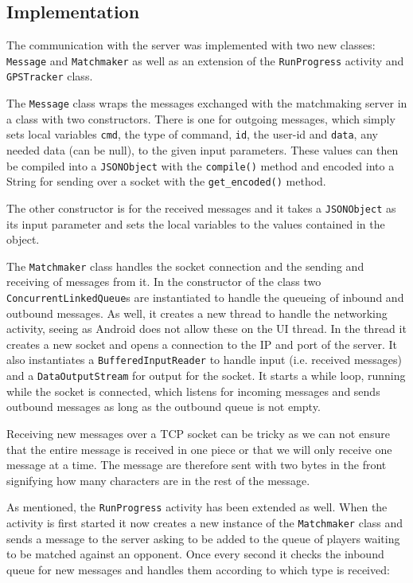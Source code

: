 \subsection{Implementation}
The communication with the server was implemented with two new classes: \texttt{Message} and \texttt{Matchmaker} as well as an extension of the \texttt{RunProgress} activity and \texttt{GPSTracker} class. 
\vspace{10pt}

The \texttt{Message} class wraps the messages exchanged with the matchmaking server in a class with two constructors. There is one for outgoing messages, which simply sets local variables \texttt{cmd}, the type of command, \texttt{id}, the user-id and \texttt{data}, any needed data (can be null), to the given input parameters. These values can then be compiled into a \texttt{JSONObject} with the \texttt{compile()} method and encoded into a String for sending over a socket with the \texttt{get\_encoded()} method. 

The other constructor is for the received messages and it takes a \texttt{JSONObject} as its input parameter and sets the local variables to the values contained in the object.
\vspace{10pt}

The \texttt{Matchmaker} class handles the socket connection and the sending and receiving of messages from it. In the constructor of the class two \texttt{ConcurrentLinkedQueue}s are instantiated to handle the queueing of inbound and outbound messages. As well, it creates a new thread to handle the networking activity, seeing as Android does not allow these on the \ac{UI} thread. In the thread it creates a new socket and opens a connection to the \ac{IP} and port of the server. It also instantiates a \texttt{BufferedInputReader} to handle input (i.e. received messages) and a \texttt{DataOutputStream} for output for the socket. It starts a while loop, running while the socket is connected, which listens for incoming messages and sends outbound messages as long as the outbound queue is not empty.

Receiving new messages over a \ac{TCP} socket can be tricky as we can not ensure that the entire message is received in one piece or that we will only receive one message at a time. The message are therefore sent with two bytes in the front signifying how many characters are in the rest of the message.
\vspace{10pt}

As mentioned, the \texttt{RunProgress} activity has been extended as well. When the activity is first started it now creates a new instance of the \texttt{Matchmaker} class and sends a message to the server asking to be added to the queue of players waiting to be matched against an opponent. Once every second it checks the inbound queue for new messages and handles them according to which type is received:

